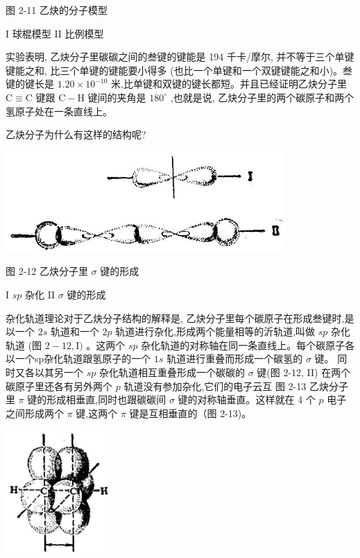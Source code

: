 \documentclass[10pt]{article}
\newcommand{\customfootnote}[1]{
  \let\thefootnote\relax\footnotetext{#1}
}
\begin{document}
图 2-11 乙炔的分子模型

I 球棍模型 II 比例模型

实验表明, 乙炔分子里碳碳之间的叁键的键能是 194 千卡/摩尔, 并不等于三个单键键能之和, 比三个单键的键能要小得多 (也比一个单键和一个双键键能之和小)。叁键的键长是 \({1.20} \times {10}^{-{10}}\) 米,比单键和双键的键长都短。并且已经证明乙炔分子里 \(\mathrm{C} \equiv \mathrm{C}\) 键跟 \(\mathrm{C} - \mathrm{H}\) 键间的夹角是 \({180}^{ \circ }\) ,也就是说, 乙炔分子里的两个碳原子和两个氢原子处在一条直线上。

\customfootnote{

① 块音 qu \(\bar{e}\) 。

}

乙炔分子为什么有这样的结构呢?

\begin{center}
\includegraphics[max width=0.8\textwidth]{images/01912d16-be99-77bb-9535-4f3ed8d9946f_78_789351.jpg}
\end{center}

图 2-12 乙炔分子里 \(\sigma\) 键的形成

I \({sp}\) 杂化 II \(\sigma\) 键的形成

杂化轨道理论对于乙炔分子结构的解释是, 乙炔分子里每个碳原子在形成叁键时,是以一个 \({2s}\) 轨道和一个 \({2p}\) 轨道进行杂化,形成两个能量相等的沂轨道,叫做 \({sp}\) 杂化轨道 (图 \(2 - {12},\mathrm{I})\) 。这两个 \({sp}\) 杂化轨道的对称轴在同一条直线上。每个碳原子各以一个sp杂化轨道跟氢原子的一个 \({1s}\) 轨道进行重叠而形成一个碳氢的 \(\sigma\) 键。 同时又各以其另一个 \({sp}\) 杂化轨道相互重叠形成一个碳碳的 \(\sigma\) 键(图 2-12, II) 在两个碳原子里还各有另外两个 \(p\) 轨道没有参加杂化,它们的电子云互 图 2-13 乙炔分子里 \(\pi\) 键的形成相垂直,同时也跟碳碳间 \(\sigma\) 键的对称轴垂直。这样就在 4 个 \(p\) 电子之间形成两个 \(\pi\) 键,这两个 \(\pi\) 键是互相垂直的（图 2-13)。

\begin{center}
\includegraphics[max width=0.3\textwidth]{images/01912d16-be99-77bb-9535-4f3ed8d9946f_78_724956.jpg}
\end{center}
\end{document}
